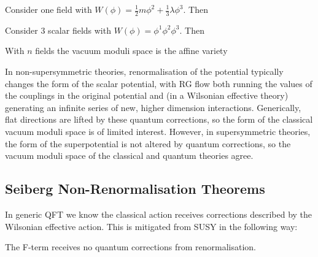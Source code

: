 \documentclass{article}
\begin{document}
\begin{example}
	Consider one field with $W(\phi)= \frac{1}{2}m\phi^2 + \frac{1}{3}\lambda \phi^3$. Then 
\end{example}
\begin{example}
	Consider 3 scalar fields with $W(\phi) = \phi^1 \phi^2 \phi^3$. Then 
\end{example}

\begin{prop}
With $n$ fields the vacuum moduli space is the affine variety 
\end{prop}

\begin{remark}
	In non-supersymmetric theories, renormalisation of the potential typically changes the
	form of the scalar potential, with RG flow both running the values of the couplings in
	the original potential and (in a Wilsonian effective theory) generating an infinite series of
	new, higher dimension interactions. Generically, flat directions are lifted by these quantum
	corrections, so the form of the classical vacuum moduli space is of limited interest. However,
	in supersymmetric theories, the form of the superpotential is not altered by quantum
	corrections, so the vacuum moduli space of the classical and quantum theories agree.
\end{remark}

\subsection{Seiberg Non-Renormalisation Theorems}
In generic QFT we know the classical action receives corrections described by the Wilsonian effective action. This is mitigated from SUSY in the following way:

\begin{theorem}
	The F-term receives no quantum corrections from renormalisation. 
\end{theorem}
\end{document}
